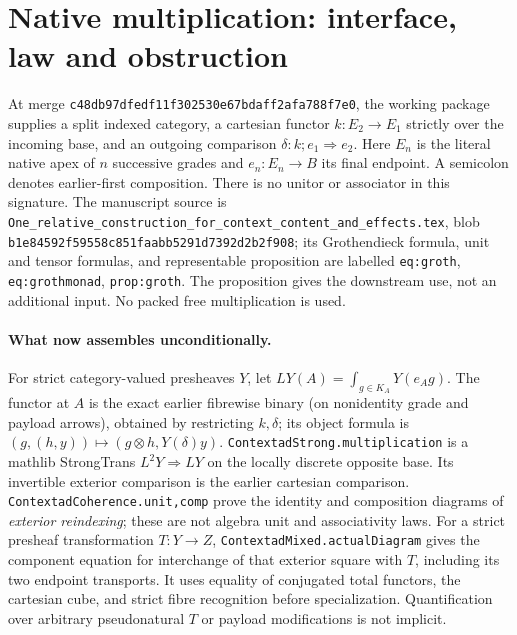 \documentclass{article}
\begin{document}
\section*{Native multiplication: interface, law and obstruction}
At merge \texttt{c48db97dfedf11f302530e67bdaff2afa788f7e0}, the working package supplies a split indexed category, a cartesian functor $k:E_2\to E_1$ strictly over the incoming base, and an outgoing comparison $\delta:k;e_1\Rightarrow e_2$. Here $E_n$ is the literal native apex of $n$ successive grades and $e_n:E_n\to B$ its final endpoint. A semicolon denotes earlier-first composition. There is no unitor or associator in this signature. The manuscript source is \texttt{One\_relative\_construction\_for\_context\_content\_and\_effects.tex}, blob \texttt{b1e84592f59558c851faabb5291d7392d2b2f908}; its Grothendieck formula, unit and tensor formulas, and representable proposition are labelled \texttt{eq:groth}, \texttt{eq:grothmonad}, \texttt{prop:groth}. The proposition gives the downstream use, not an additional input. No packed free multiplication is used.
\paragraph{What now assembles unconditionally.} For strict category-valued presheaves $Y$, let $L Y(A)=\int_{g\in K_A}Y(e_Ag)$. The functor at $A$ is the exact earlier fibrewise binary (on nonidentity grade and payload arrows), obtained by restricting $k,\delta$; its object formula is $(g,(h,y))\mapsto(g\otimes h,Y(\delta)y)$. \texttt{ContextadStrong.multiplication} is a mathlib StrongTrans $L^2Y\Rightarrow LY$ on the locally discrete opposite base. Its invertible exterior comparison is the earlier cartesian comparison. \texttt{ContextadCoherence.unit,comp} prove the identity and composition diagrams of \emph{exterior reindexing}; these are not algebra unit and associativity laws. For a strict presheaf transformation $T:Y\to Z$, \texttt{ContextadMixed.actualDiagram} gives the component equation for interchange of that exterior square with $T$, including its two endpoint transports. It uses equality of conjugated total functors, the cartesian cube, and strict fibre recognition before specialization. Quantification over arbitrary pseudonatural $T$ or payload modifications is not implicit.
\end{document}
